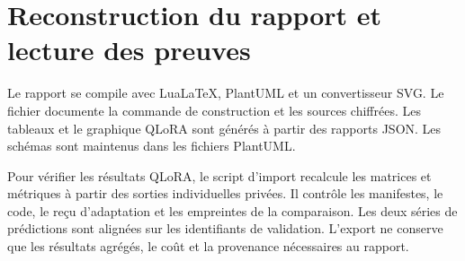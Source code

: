 \section{Reconstruction du rapport et lecture des preuves}

Le rapport se compile avec LuaLaTeX, PlantUML et un convertisseur SVG. Le fichier  documente la commande de construction et les sources chiffrées. Les tableaux et le graphique QLoRA sont générés à partir des rapports JSON. Les schémas sont maintenus dans les fichiers PlantUML.

Pour vérifier les résultats QLoRA, le script d’import recalcule les matrices et métriques à partir des sorties individuelles privées. Il contrôle les manifestes, le code, le reçu d’adaptation et les empreintes de la comparaison. Les deux séries de prédictions sont alignées sur les identifiants de validation. L’export ne conserve que les résultats agrégés, le coût et la provenance nécessaires au rapport.

